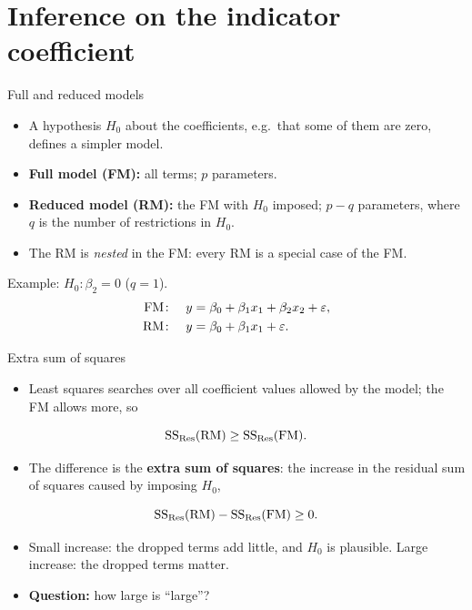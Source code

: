 \section{Inference on the indicator coefficient}


\begin{frame}{Full and reduced models}
    \begin{itemize}
        \item A hypothesis $H_0$ about the coefficients, e.g.\ that some of them are zero, defines a simpler model.
        \item \textbf{Full model (FM):} all terms; $p$ parameters.
        \item \textbf{Reduced model (RM):} the FM with $H_0$ imposed; $p - q$ parameters, where $q$ is the number of restrictions in $H_0$.
        \item The RM is \emph{nested} in the FM: every RM is a special case of the FM.
    \end{itemize}
    \vspace{0.5em}
    Example: $H_0\colon \beta_2 = 0$ ($q = 1$).
    \begin{align*}
        \mathrm{FM}\colon\quad y &= \beta_0 + \beta_1 x_1 + \beta_2 x_2 + \varepsilon, \\
        \mathrm{RM}\colon\quad y &= \beta_0 + \beta_1 x_1 + \varepsilon .
    \end{align*}
\end{frame}


\begin{frame}{Extra sum of squares}
    \begin{itemize}
        \item Least squares searches over all coefficient values allowed by the model; the FM allows more, so
    \end{itemize}
    \[
        \mathrm{SS}_{\mathrm{Res}}(\mathrm{RM}) \ge \mathrm{SS}_{\mathrm{Res}}(\mathrm{FM}).
    \]
    \begin{itemize}
        \item The difference is the \textbf{extra sum of squares}: the increase in the residual sum of squares caused by imposing $H_0$,
    \end{itemize}
    \[
        \mathrm{SS}_{\mathrm{Res}}(\mathrm{RM}) - \mathrm{SS}_{\mathrm{Res}}(\mathrm{FM}) \ge 0 .
    \]
    \begin{itemize}
        \item Small increase: the dropped terms add little, and $H_0$ is plausible. Large increase: the dropped terms matter.
        \item \textbf{Question:} how large is ``large''?
    \end{itemize}
\end{frame}


